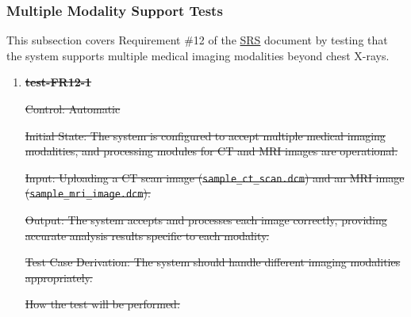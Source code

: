 \documentclass[12pt, titlepage]{article}
\begin{document}
\subsubsection{Multiple Modality Support Tests}

This subsection covers Requirement \#12 of the 
\href{https://github.com/RezaJodeiri/CXR-Capstone/blob/main/docs/SRS/SRS.pdf}{SRS} 
\citep{SRS} document by testing that the system supports multiple medical imaging modalities beyond chest X-rays.

\begin{enumerate}

\item \textbf{\sout{test-FR12-1}} \label{test-FR12-1}

\sout{Control: Automatic}

\sout{Initial State: The system is configured to accept multiple medical imaging modalities, and processing modules for CT and MRI images are operational.}

\sout{Input: Uploading a CT scan image (\texttt{sample\_ct\_scan.dcm}) and an MRI image (\texttt{sample\_mri\_image.dcm}).}

\sout{Output: The system accepts and processes each image correctly, providing accurate analysis results specific to each modality.}

\sout{Test Case Derivation: The system should handle different imaging modalities appropriately.}

\sout{How the test will be performed:}


\end{enumerate}
\end{document}
